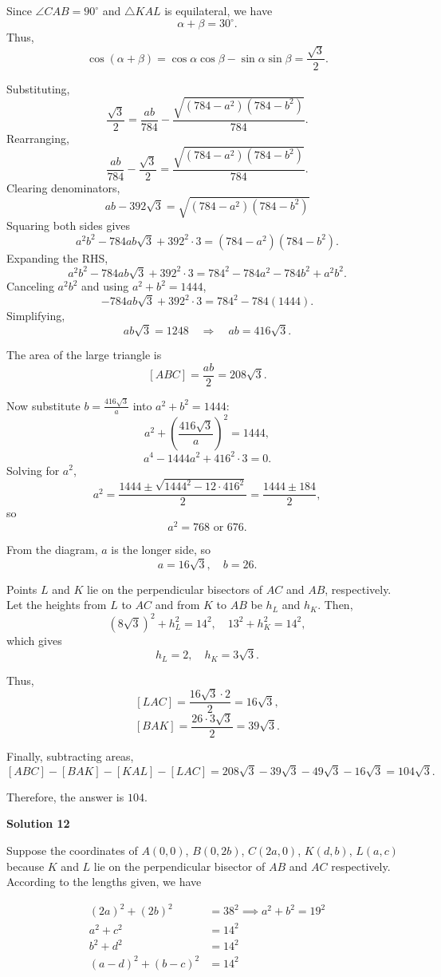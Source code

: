 \begin{enumerate}
 Since $\angle CAB=90^\circ$ and $\triangle KAL$ is equilateral, we have
 \[\alpha+\beta=30^\circ.\]Thus,
 \[\cos(\alpha+\beta)=\cos\alpha\cos\beta-\sin\alpha\sin\beta=\frac{\sqrt{3}}{2}.\]

 Substituting,
 \[\frac{\sqrt{3}}{2}=\frac{ab}{784}-\frac{\sqrt{(784-a^2)(784-b^2)}}{784}.\]Rearranging,
 \[\frac{ab}{784}-\frac{\sqrt{3}}{2}=\frac{\sqrt{(784-a^2)(784-b^2)}}{784}.\]Clearing denominators,
 \[ab-392\sqrt{3}=\sqrt{(784-a^2)(784-b^2)}\]Squaring both sides gives
 \[a^2b^2-784ab\sqrt{3}+392^2\cdot3=(784-a^2)(784-b^2).\]Expanding the RHS,
 \[a^2b^2-784ab\sqrt{3}+392^2\cdot3=784^2-784a^2-784b^2+a^2b^2.\]Canceling $a^2b^2$ and using $a^2+b^2=1444$,
 \[-784ab\sqrt{3}+392^2\cdot3=784^2-784(1444).\]Simplifying,
 \[ab\sqrt{3}=1248 \quad \Rightarrow \quad ab=416\sqrt{3}.\]

 The area of the large triangle is
 \[[ABC]=\frac{ab}{2}=208\sqrt{3}.\]

 Now substitute $b=\frac{416\sqrt{3}}{a}$ into $a^2+b^2=1444$:
 \[a^2+\left(\frac{416\sqrt{3}}{a}\right)^2=1444,\]
 \[a^4-1444a^2+416^2\cdot3=0.\]Solving for $a^2$,
 \[a^2=\frac{1444\pm\sqrt{1444^2-12\cdot416^2}}{2}=\frac{1444\pm184}{2},\]so
 \[a^2=768 \text{ or } 676.\]

 From the diagram, $a$ is the longer side, so
 \[a=16\sqrt{3}, \quad b=26.\]

 Points $L$ and $K$ lie on the perpendicular bisectors of $AC$ and $AB$, respectively. Let the heights from $L$ to $AC$ and from $K$ to $AB$ be $h_L$ and $h_K$. Then,
 \[(8\sqrt{3})^2+h_L^2=14^2, \quad 13^2+h_K^2=14^2,\]which gives
 \[h_L=2, \quad h_K=3\sqrt{3}.\]

 Thus,
 \[[LAC]=\frac{16\sqrt{3}\cdot2}{2}=16\sqrt{3},\]
 \[[BAK]=\frac{26\cdot3\sqrt{3}}{2}=39\sqrt{3}.\]

 Finally, subtracting areas,
 \[[ABC]-[BAK]-[KAL]-[LAC]=208\sqrt{3} - 39\sqrt{3} - 49\sqrt{3} - 16\sqrt{3} = 104\sqrt{3}.\]

 Therefore, the answer is $\boxed{104}$.

 



\textbf{Solution 12}

Suppose the coordinates of $A(0, 0)$, $B(0, 2b)$, $C(2a, 0)$, $K(d, b)$, $L(a, c)$ because $K$ and $L$ lie on the perpendicular bisector of $AB$ and $AC$ respectively. According to the lengths given, we have

 \begin{align}(2a)^2 + (2b)^2 &= 38^2 \implies a^2 + b^2 = 19^2 \tag{1}\\a^2 + c^2 &= 14^2 \tag{2}\\b^2 + d^2 &= 14^2 \tag{3}\\(a - d)^2 + (b - c)^2 &= 14^2 \tag{4}\end{align}


\end{enumerate}
